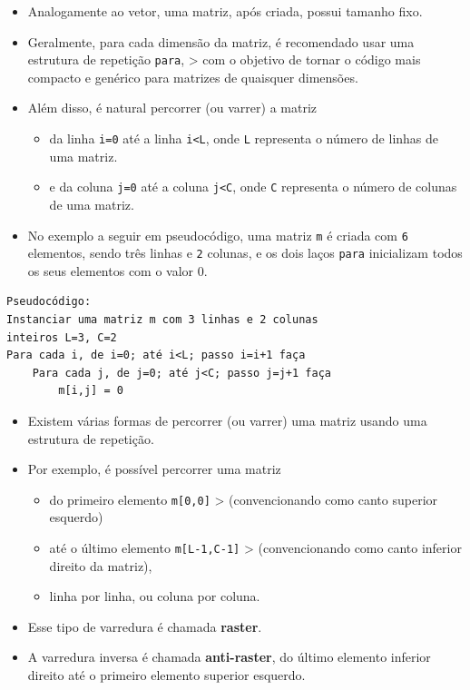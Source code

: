 \documentclass[12pt,a4paper]{article}
\providecommand{\tightlist}{%
      \setlength{\itemsep}{0pt}\setlength{\parskip}{0pt}}
\begin{document}
    \begin{itemize}
\tightlist
\item
  Analogamente ao vetor, uma matriz, após criada, possui tamanho fixo.
\item
  Geralmente, para cada dimensão da matriz, é recomendado usar uma
  estrutura de repetição \texttt{para}, \textgreater{} com o objetivo de
  tornar o código mais compacto e genérico para matrizes de quaisquer
  dimensões.
\item
  Além disso, é natural percorrer (ou varrer) a matriz

  \begin{itemize}
  \tightlist
  \item
    da linha \texttt{i=0} até a linha \texttt{i\textless{}L}, onde
    \texttt{L} representa o número de linhas de uma matriz.
  \item
    e da coluna \texttt{j=0} até a coluna \texttt{j\textless{}C}, onde
    \texttt{C} representa o número de colunas de uma matriz.
  \end{itemize}
\item
  No exemplo a seguir em pseudocódigo, uma matriz \texttt{m} é criada
  com \texttt{6} elementos, sendo três linhas e \texttt{2} colunas, e os
  dois laços \texttt{para} inicializam todos os seus elementos com o
  valor 0.
\end{itemize}

    \begin{verbatim}
Pseudocódigo:
Instanciar uma matriz m com 3 linhas e 2 colunas
inteiros L=3, C=2
Para cada i, de i=0; até i<L; passo i=i+1 faça
    Para cada j, de j=0; até j<C; passo j=j+1 faça
        m[i,j] = 0
\end{verbatim}

    \begin{itemize}
\item
  Existem várias formas de percorrer (ou varrer) uma matriz usando uma
  estrutura de repetição.
\item
  Por exemplo, é possível percorrer uma matriz

  \begin{itemize}
  \tightlist
  \item
    do primeiro elemento \texttt{m{[}0,0{]}} \textgreater{}
    (convencionando como canto superior esquerdo)
  \item
    até o último elemento \texttt{m{[}L-1,C-1{]}} \textgreater{}
    (convencionando como canto inferior direito da matriz),
  \item
    linha por linha, ou coluna por coluna.
  \end{itemize}
\item
  Esse tipo de varredura é chamada \textbf{raster}.
\item
  A varredura inversa é chamada \textbf{anti-raster}, do último elemento
  inferior direito até o primeiro elemento superior esquerdo.
\end{itemize}
\end{document}
